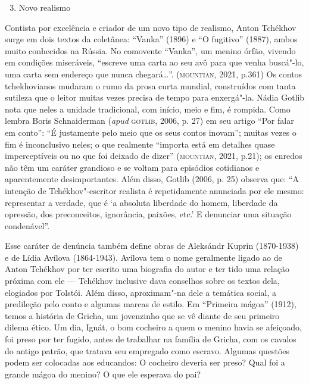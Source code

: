 \documentclass[11pt]{extarticle}
\begin{document}
\begin{figure}[ht!]
\end{figure}

\begin{enumerate}
\setcounter{enumi}{2}
\item Novo realismo
\end{enumerate}

Contista por excelência e criador de um novo tipo de realismo, Anton
Tchékhov surge em dois textos da coletânea: ``Vanka'' (1896) e ``O
fugitivo'' (1887), ambos muito conhecidos na Rússia. No comovente
``Vanka''\emph{,} um menino órfão, vivendo em condições miseráveis,
``escreve uma carta ao seu avô para que venha buscá"-lo, uma carta sem
endereço que nunca chegará\ldots{}''. (\textsc{mountian}, 2021, p.361) Os contos
tchekhovianos mudaram o rumo da prosa curta mundial, construídos com
tanta sutileza que o leitor muitas vezes precisa de tempo para
enxergá"-la. Nádia Gotlib nota que neles a unidade tradicional, com
início, meio e fim, é rompida. Como lembra Boris Schnaiderman
(\emph{apud} \textsc{gotlib}, 2006, p. 27) em seu artigo ``Por falar em conto'':
``É justamente pelo meio que os seus contos inovam''; muitas vezes o fim
é inconclusivo neles; o que realmente ``importa está em detalhes quase
imperceptíveis ou no que foi deixado de dizer'' (\textsc{mountian}, 2021, p.21);
os enredos não têm um caráter grandioso e se voltam para episódios
cotidianos e aparentemente desimportantes. Além disso, Gotlib (2006, p.
25) observa que: ``A intenção de Tchékhov"-escritor realista é
repetidamente anunciada por ele mesmo: representar a verdade, que é `a
absoluta liberdade do homem, liberdade da opressão, dos preconceitos,
ignorância, paixões, etc.' E denunciar uma situação condenável''.

\begin{figure}[ht!]
\end{figure}


Esse caráter de denúncia também define obras de Aleksándr Kuprin
(1870-1938) e de Lídia Avílova (1864-1943). Avílova tem o nome
geralmente ligado ao de Anton Tchékhov por ter escrito uma biografia do
autor e ter tido uma relação próxima com ele --- Tchékhov inclusive dava
conselhos sobre os textos dela, elogiados por Tolstói. Além disso,
aproximam"-na dele a temática social, a predileção pelo conto e algumas
marcas de estilo. Em ``Primeira mágoa'' (1912), temos a história
de Gricha, um jovenzinho que se vê diante de seu primeiro dilema ético.
Um dia, Ignát, o bom cocheiro a quem o menino havia se afeiçoado, foi
preso por ter fugido, antes de trabalhar na família de Gricha, com os
cavalos do antigo patrão, que tratava seu empregado como escravo.
Algumas questões podem ser colocadas aos educandos: O cocheiro deveria
ser preso? Qual foi a grande mágoa do menino? O que ele esperava do pai?
\end{document}
